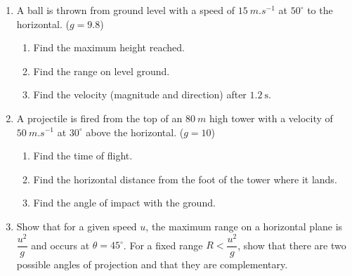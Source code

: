 \documentclass[11pt]{article}
\begin{document}
\begin{exercice}
\begin{enumerate}
    \item A ball is thrown from ground level with a speed of $\SI{15}{m.s^{-1}}$ at $50^\circ$ to the horizontal. ($g=9.8$)
    \begin{enumerate}
        \item Find the maximum height reached.
        \item Find the range on level ground.
        \item Find the velocity (magnitude and direction) after $1.2\ \mathrm{s}$.
    \end{enumerate}
    \item A projectile is fired from the top of an $\SI{80}{m}$ high tower with a velocity of $\SI{50}{m.s^{-1}}$ at $30^\circ$ above the horizontal. ($g=10$)
    \begin{enumerate}
        \item Find the time of flight.
        \item Find the horizontal distance from the foot of the tower where it lands.
        \item Find the angle of impact with the ground.
    \end{enumerate}
    \item Show that for a given speed $u$, the maximum range on a horizontal plane is $\dfrac{u^2}{g}$ and occurs at $\theta = 45^\circ$. For a fixed range $R < \dfrac{u^2}{g}$, show that there are two possible angles of projection and that they are complementary.
\end{enumerate}
\end{exercice}
\end{document}
